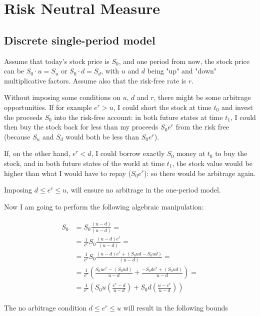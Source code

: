 \chapter{Risk Neutral Measure}
\label{risk-neutral}

\section{Discrete single-period model}
\label{sec:risk_neutral1}
Assume that today's stock price is $𝑆_0$, and one period from now, the stock price can be $𝑆_0\cdot u = 𝑆_𝑢$ or $𝑆_0\cdot 𝑑 = 𝑆_𝑑$, with $𝑢$ and $𝑑$ being "up" and "down" multiplicative factors. Assume also that the risk-free rate is $𝑟$.

Without imposing some conditions on $𝑢$, $𝑑$ and $𝑟$, there might be some arbitrage opportunities. If for example $𝑒^{r} > 𝑢$, I could short the stock at time $𝑡_0$ and invest the proceeds $𝑆_0$ into the risk-free account: in both future states at time $𝑡_1$, I could then buy the stock back for less than my proceeds $𝑆_0 𝑒^{𝑟}$ from the risk free (because $𝑆_𝑢$ and $𝑆_𝑑$ would both be less than $𝑆_0 𝑒^{r}$).

If, on the other hand, $𝑒^{r} < 𝑑$, I could borrow exactly $𝑆_0$ money at $𝑡_0$ to buy the stock, and in both future states of the world at time $𝑡_1$, the stock value would be higher than what I would have to repay ($𝑆_0 𝑒^{r}$): so there would be arbitrage again.

Imposing $𝑑 \le e^{r} \le 𝑢$, will ensure no arbitrage in the one-period model.

Now I am going to perform the following algebraic manipulation:

\begin{align}
\begin{split}
𝑆_0 &=𝑆_0 \frac{(𝑢−𝑑)}{(𝑢−𝑑)} = \\
&=\frac{1}{𝑒^{r}}𝑆_0 \frac{(𝑢−𝑑)𝑒^{r}}{(𝑢−𝑑)}= \\
&=\frac{1}{𝑒^{r}}𝑆_0 \frac{(𝑢−𝑑)𝑒^{r}+(𝑆_0𝑢𝑑−𝑆_0𝑢𝑑)}{(𝑢−𝑑)}= \\
&=\frac{1}{𝑒^{r}}\left(\frac{𝑆_0𝑢𝑒^{𝑟}−(𝑆_0𝑢𝑑)}{𝑢−𝑑}+\frac{−𝑆_0𝑑𝑒^{𝑟}+(𝑆_0𝑢𝑑)}{𝑢−𝑑}\right)= \\
&=\frac{1}{𝑒^{r}}(𝑆_0𝑢 \left(\frac{𝑒^{𝑟}−𝑑}{𝑢−𝑑}\right)+𝑆_0𝑑\left(\frac{𝑢−𝑒^{𝑟}}{𝑢−𝑑}\right))
\end{split}
\end{align}

The no arbitrage condition $𝑑 \le e^{r} \le 𝑢$ will result in the following bounds 

